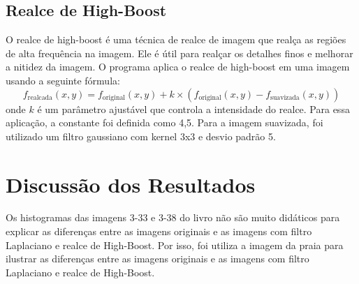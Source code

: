 \documentclass{article}
\begin{document}
\subsection{Realce de High-Boost}
O realce de high-boost é uma técnica de realce de imagem que realça as regiões de alta frequência na imagem. Ele é útil para realçar os detalhes finos e melhorar a nitidez da imagem. O programa aplica o realce de high-boost em uma imagem usando a seguinte fórmula:
\[
f_{\text{realcada}}(x,y) = f_{\text{original}}(x,y) + k \times (f_{\text{original}}(x,y) - f_{\text{suavizada}}(x,y))
\]
onde $k$ é um parâmetro ajustável que controla a intensidade do realce. Para essa aplicação, a constante foi definida como 4,5.
Para a imagem suavizada, foi utilizado um filtro gaussiano com kernel 3x3 e desvio padrão 5.
\section{Discussão dos Resultados}
Os histogramas das imagens 3-33 e 3-38 do livro não são muito didáticos para explicar as diferenças entre as imagens originais e as imagens com filtro Laplaciano e realce de High-Boost. Por isso, foi utiliza a imagem da praia para ilustrar as diferenças entre as imagens originais e as imagens com filtro Laplaciano e realce de High-Boost.
\end{document}
